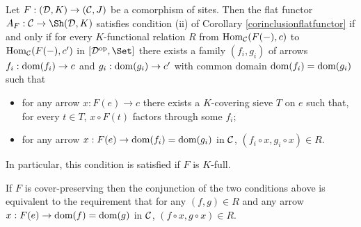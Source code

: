 \documentclass[a4paper,12pt]{article}
\begin{document}
\begin{proposition}\label{propsatisfactionconditionii}
	Let  $F:({\cal D}, K)\to ({\cal C}, J)$ be a comorphism of sites. Then the flat functor $A_{F}:{\cal C}\to \Sh({\cal D}, K)$ satisfies condition (ii) of Corollary \ref{corinclusionflatfunctor} if and only if for every $K$-functional relation $R$ from $\textup{Hom}_{\cal C}(F(-), c)$ to $\textup{Hom}_{\cal C}(F(-), c')$ in $[{\cal D}^{\textup{op}}, \Set]$ there exists a family $(f_{i}, g_{i})$ of arrows $f_{i}:\textup{dom}(f_{i}) \to c$ and $g_{i}:\textup{dom}(g_{i}) \to c'$ with common domain $\textup{dom}(f_{i})=\textup{dom}(g_{i})$ such that
	\begin{itemize}
		\item for any arrow $x:F(e)\to c$ there exists a $K$-covering sieve $T$ on $e$ such that, for every $t\in T$, $x\circ F(t)$ factors through some $f_{i}$;
		
		\item for any arrow $x:F(e)\to \textup{dom}(f_{i})=\textup{dom}(g_{i})$ in $\cal C$, $(f_{i}\circ x, g_{i}\circ x)\in R$.
	\end{itemize}
In particular, this condition is satisfied if $F$ is $K$-full.   

If $F$ is cover-preserving then the conjunction of the two conditions above is equivalent to the requirement that for any $(f,g)\in R$ and any arrow $x:F(e)\to \textup{dom}(f)=\textup{dom}(g)$ in $\cal C$, $(f\circ x, g\circ x)\in R$.
\end{proposition}
\end{document}
